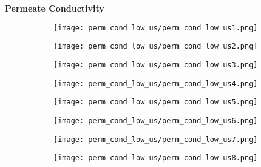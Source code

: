 \documentclass{article}
\begin{document}
    \textbf{Permeate Conductivity}
    \begin{figure}[H]
        \centering
        \begin{subfigure}{0.48\linewidth}
		    \texttt{[image: perm\_cond\_low\_us/perm\_cond\_low\_us1.png]}
	    \end{subfigure}
	    \begin{subfigure}{0.48\linewidth}
		    \texttt{[image: perm\_cond\_low\_us/perm\_cond\_low\_us2.png]}
	    \end{subfigure}
	    \begin{subfigure}{0.48\linewidth}
		    \texttt{[image: perm\_cond\_low\_us/perm\_cond\_low\_us3.png]}
	    \end{subfigure}
	    \begin{subfigure}{0.48\linewidth}
		    \texttt{[image: perm\_cond\_low\_us/perm\_cond\_low\_us4.png]}
	    \end{subfigure}
	    \begin{subfigure}{0.48\linewidth}
		    \texttt{[image: perm\_cond\_low\_us/perm\_cond\_low\_us5.png]}
	    \end{subfigure}
	    \begin{subfigure}{0.48\linewidth}
		    \texttt{[image: perm\_cond\_low\_us/perm\_cond\_low\_us6.png]}
	    \end{subfigure}
	    \begin{subfigure}{0.48\linewidth}
		    \texttt{[image: perm\_cond\_low\_us/perm\_cond\_low\_us7.png]}
	    \end{subfigure}
	    \begin{subfigure}{0.48\linewidth}
		    \texttt{[image: perm\_cond\_low\_us/perm\_cond\_low\_us8.png]}
	    \end{subfigure}
    \end{figure}
    
    \pagebreak
    
\end{document}
